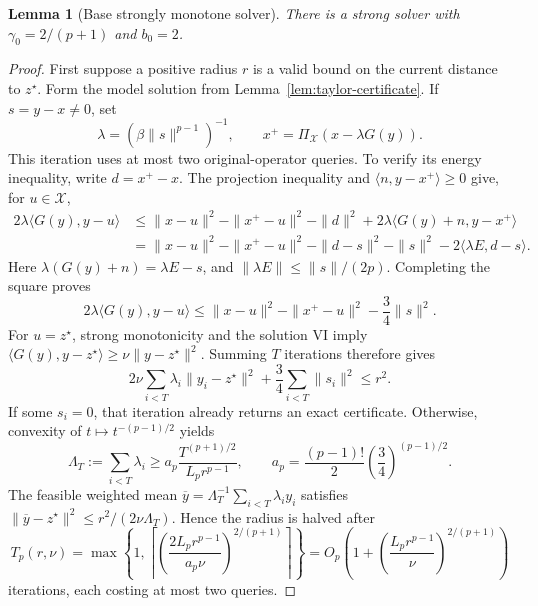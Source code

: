\documentclass[11pt]{article}
\numberwithin{equation}{section}
\newtheorem{lemma}[theorem]{Lemma}
\theoremstyle{definition}
\theoremstyle{remark}
\begin{document}
\begin{lemma}[Base strongly monotone solver]\label{lem:strong-base}
There is a strong solver with
\(\gamma_0=2/(p+1)\) and \(b_0=2\).
\end{lemma}

\begin{proof}
First suppose a positive radius \(r\) is a valid bound on the current
distance to \(z^\star\). Form the model solution from
Lemma~\ref{lem:taylor-certificate}. If \(s=y-x\ne0\), set
\[
\lambda=(\beta\|s\|^{p-1})^{-1},
\qquad x^+=\Pi_{\mathcal X}(x-\lambda G(y)).
\]
This iteration uses at most two original-operator queries. To verify its
energy inequality, write \(d=x^+-x\). The projection inequality and
\(\langle n,y-x^+\rangle\ge0\) give, for \(u\in\mathcal X\),
\begin{align*}
2\lambda\langle G(y),y-u\rangle
&\le\|x-u\|^2-\|x^+-u\|^2-\|d\|^2
       +2\lambda\langle G(y)+n,y-x^+\rangle\\
&=\|x-u\|^2-\|x^+-u\|^2-\|d-s\|^2-\|s\|^2
       -2\langle\lambda E,d-s\rangle.
\end{align*}
Here \(\lambda(G(y)+n)=\lambda E-s\), and
\(\|\lambda E\|\le\|s\|/(2p)\). Completing the square proves
\begin{equation}\label{eq:extragradient-descent}
2\lambda\langle G(y),y-u\rangle
\le\|x-u\|^2-\|x^+-u\|^2-\frac34\|s\|^2.
\end{equation}
For \(u=z^\star\), strong monotonicity and the solution VI imply
\(\langle G(y),y-z^\star\rangle\ge\nu\|y-z^\star\|^2\).
Summing \(T\) iterations therefore gives
\begin{equation}\label{eq:extragradient-sum}
2\nu\sum_{i<T}\lambda_i\|y_i-z^\star\|^2
+\frac34\sum_{i<T}\|s_i\|^2\le r^2.
\end{equation}
If some \(s_i=0\), that iteration already returns an exact certificate.
Otherwise, convexity of \(t\mapsto t^{-(p-1)/2}\) yields
\begin{equation}\label{eq:stepsize-sum}
\Lambda_T:=\sum_{i<T}\lambda_i
\ge a_p\frac{T^{(p+1)/2}}{L_pr^{p-1}},
\qquad
 a_p=\frac{(p-1)!}{2}\left(\frac34\right)^{(p-1)/2}.
\end{equation}
The feasible weighted mean
\(\overline y=\Lambda_T^{-1}\sum_{i<T}\lambda_i y_i\) satisfies
\(\|\overline y-z^\star\|^2\le r^2/(2\nu\Lambda_T)\).
Hence the radius is halved after
\begin{equation}\label{eq:base-halving-cost}
T_p(r,\nu)=\max\left\{1,
\left\lceil
\left(\frac{2L_pr^{p-1}}{a_p\nu}\right)^{2/(p+1)}
\right\rceil\right\}
=O_p\!\left(1+\left(\frac{L_pr^{p-1}}{\nu}\right)^{2/(p+1)}\right)
\end{equation}
iterations, each costing at most two queries.


\end{proof}
\end{document}
